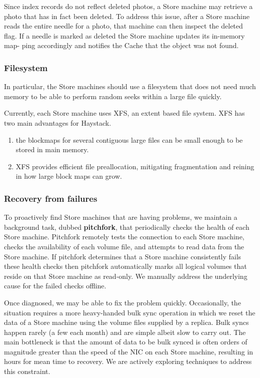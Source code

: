 \documentclass[11pt]{article}
\begin{document}
Since index records do not reflect deleted photos, a Store machine may retrieve a photo that has in
fact been deleted. To address this issue, after a Store machine reads the entire needle for a photo,
that machine can then inspect the deleted flag. If a needle is marked as deleted the Store machine
updates its in-memory map- ping accordingly and notifies the Cache that the object was not found.
\subsubsection{Filesystem}
\label{sec:org1a1d8ca}
In particular, the Store machines should use a filesystem that does not need much memory to be able to
perform random seeks within a large file quickly.

Currently, each Store machine uses XFS, an extent based file system. XFS has two main advantages for
Haystack.
\begin{enumerate}
\item the blockmaps for several contiguous large files can be small enough to be stored in main memory.
\item XFS provides efficient file preallocation, mitigating fragmentation and reining in how large block
maps can grow.
\end{enumerate}
\subsubsection{Recovery from failures}
\label{sec:orgb695815}
To proactively find Store machines that are having problems, we maintain a background task, dubbed
\textbf{pitchfork}, that periodically checks the health of each Store machine. Pitchfork remotely tests the
connection to each Store machine, checks the availability of each volume file, and attempts to read
data from the Store machine. If pitchfork determines that a Store machine consistently fails these
health checks then pitchfork automatically marks all logical volumes that reside on that Store machine
as read-only. We manually address the underlying cause for the failed checks offline.

Once diagnosed, we may be able to fix the problem quickly. Occasionally, the situation requires a more
heavy-handed bulk sync operation in which we reset the data of a Store machine using the volume files
supplied by a replica. Bulk syncs happen rarely (a few each month) and are simple albeit slow to carry
out. The main bottleneck is that the amount of data to be bulk synced is often orders of magnitude
greater than the speed of the NIC on each Store machine, resulting in hours for mean time to recovery.
We are actively exploring techniques to address this constraint.
\end{document}

